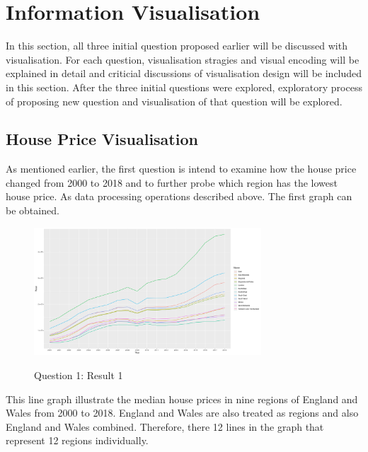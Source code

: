 \documentclass{article}
\begin{document}
\section{Information Visualisation}
In this section, all three initial question proposed earlier will be discussed with visualisation. 
For each question, visualisation stragies and visual encoding will be explained in detail and 
criticial discussions of visualisation design will be included in this section. After the three initial 
questions were explored, exploratory process of proposing new question and visualisation of that question 
will be explored.

\subsection{House Price Visualisation}
As mentioned earlier, the first question is intend to examine how the house price changed from 2000 to 2018 
and to further probe which region has the lowest house price. As data processing operations described above. 
The first graph can be obtained.

\begin{figure}[H]
  \begin{minipage}[b]{1.0\linewidth}
    \centering
    \centerline{\includegraphics[width=8.5cm]{Q1Geom_line}}
    \centerline{Question 1: Result 1}\medskip
  \end{minipage}
\end{figure}

This line graph illustrate the median house prices in nine regions of England and Wales from 2000 to 2018. 
England and Wales are also treated as regions and also England and Wales combined. Therefore, there 12 lines 
in the graph that represent 12 regions individually. 
\end{document}
